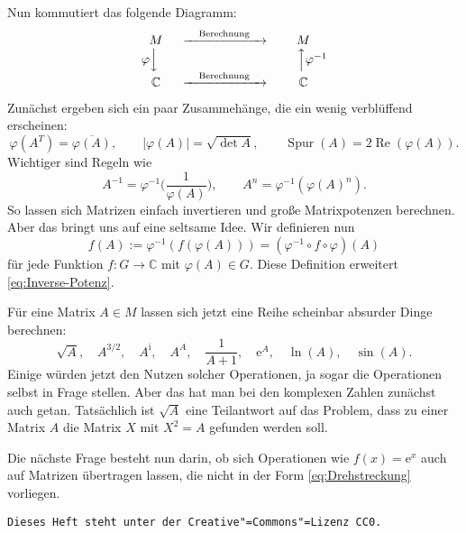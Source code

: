 \documentclass[a4paper,11pt,fleqn,twoside]{scrartcl}
\numberwithin{equation}{section}
\newcommand{\C}{\mathbb C}
\renewcommand{\Re}{\operatorname{Re}}
\newcommand{\ui}{\mathrm i}
\newcommand{\ee}{\mathrm e}
\begin{document}
Nun kommutiert das folgende Diagramm:
\begin{equation}
\begin{matrix}
M & \xrightarrow{\quad\text{Berechnung}\quad} & M\\
\varphi\Big\downarrow\hspace{1em} & & \hspace{1.4em}\Big\uparrow\varphi^{-1}\\
\C & \xrightarrow{\quad\text{Berechnung}\quad} & \C
\end{matrix}
\end{equation}
Zunächst ergeben sich ein paar Zusammehänge, die ein wenig
verblüffend erscheinen:
\begin{equation}
\varphi(A^T) = \overline{\varphi(A)},\qquad
|\varphi(A)| = \sqrt{\det A},\qquad
\operatorname{Spur}(A) = 2\Re(\varphi(A)).
\end{equation}
Wichtiger sind Regeln wie
\begin{equation}\label{eq:Inverse-Potenz}
A^{-1} = \varphi^{-1}\bigg(\frac{1}{\varphi(A)}\bigg),\qquad
A^n = \varphi^{-1}(\varphi(A)^n).
\end{equation}
So lassen sich Matrizen einfach invertieren und große
Matrixpotenzen berechnen. Aber das bringt uns auf eine seltsame
Idee. Wir definieren nun
\begin{equation}
f(A) := \varphi^{-1}(f(\varphi(A))) = (\varphi^{-1}\circ f\circ\varphi)(A)
\end{equation}
für jede Funktion $f\colon G\to\C$ mit $\varphi(A)\in G$.
Diese Definition erweitert \eqref{eq:Inverse-Potenz}.

Für eine Matrix $A\in M$ lassen sich jetzt eine Reihe scheinbar
absurder Dinge berechnen:%
\begin{equation}
\sqrt{A},\quad A^{3/2},\quad A^\ui, \quad A^A,\quad \frac{1}{A+1},
\quad \ee^A, \quad \ln(A), \quad \sin(A).
\end{equation}
Einige würden jetzt den Nutzen solcher Operationen, ja sogar die
Operationen selbst in Frage stellen. Aber das hat man bei den
komplexen Zahlen zunächst auch getan. Tatsächlich ist $\sqrt{A}$ eine
Teilantwort auf das Problem, dass zu einer Matrix $A$ die Matrix $X$
mit $X^2=A$ gefunden werden soll.

Die nächste Frage besteht nun darin, ob sich Operationen
wie $f(x)=\ee^x$ auch auf Matrizen übertragen lassen,
die nicht in der Form \eqref{eq:Drehstreckung} vorliegen.

\vfill
\texttt{Dieses Heft steht unter der Creative"=Commons"=Lizenz CC0.}
\end{document}
